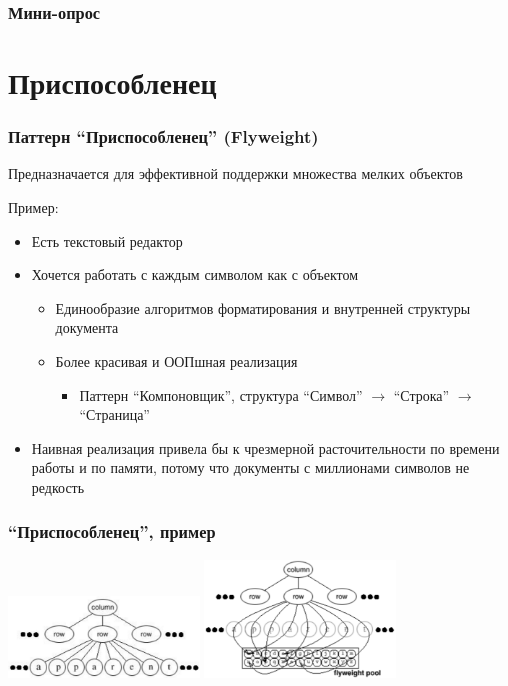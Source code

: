 \documentclass[xetex,mathserif,serif]{beamer}
\begin{document}
    \begin{frame}
        \frametitle{Мини-опрос}
    \end{frame}
    
    \section{Приспособленец}

    \begin{frame}
        \frametitle{Паттерн ``Приспособленец'' (Flyweight)}
        Предназначается для эффективной поддержки множества мелких объектов

        Пример:

        \begin{itemize}
            \item Есть текстовый редактор
            \item Хочется работать с каждым символом как с объектом
            \begin{itemize}
                \item Единообразие алгоритмов форматирования и внутренней структуры документа
                \item Более красивая и ООПшная реализация
                \begin{itemize}
                    \item Паттерн ``Компоновщик'', структура ``Символ'' $\rightarrow$ ``Строка'' $\rightarrow$ ``Страница''
                \end{itemize}
            \end{itemize}
            \item Наивная реализация привела бы к чрезмерной расточительности по времени работы и по памяти, потому что документы с миллионами символов не редкость
        \end{itemize}
    \end{frame}

    \begin{frame}
        \frametitle{``Приспособленец'', пример}
        \begin{center}
            \includegraphics[width=0.38\textwidth]{noFlyweight.png}
            \raisebox{0.1\textheight}{\quad\Huge{$\rightarrow$}\quad}
            \includegraphics[width=0.38\textwidth]{flyweightExample.png}
        \end{center}
    \end{frame}
\end{document}
